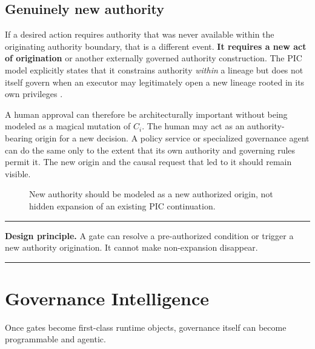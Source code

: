 \documentclass[10pt,oneside,openany]{book}
\newcommand{\principle}[1]{%
  \vspace{4pt}
  \noindent\begin{minipage}{\linewidth}
  \hrule\vspace{5pt}
  \small\sffamily\raggedright\textbf{Design principle.} #1
  \vspace{5pt}\hrule
  \end{minipage}\vspace{4pt}
}
\begin{document}
\section{Genuinely new authority}
If a desired action requires authority that was never available within the originating authority boundary, that is a different event. \textbf{It requires a new act of origination} or another externally governed authority construction. The PIC model explicitly states that it constrains authority \emph{within} a lineage but does not itself govern when an executor may legitimately open a new lineage rooted in its own privileges \cite{gallo2026pic}.

A human approval can therefore be architecturally important without being modeled as a magical mutation of $C_i$. The human may act as an authority-bearing origin for a new decision. A policy service or specialized governance agent can do the same only to the extent that its own authority and governing rules permit it. The new origin and the causal request that led to it should remain visible.

\begin{figure}[ht]
\centering
{}
\caption{New authority should be modeled as a new authorized origin, not hidden expansion of an existing PIC continuation.}
\end{figure}

\principle{A gate can resolve a pre-authorized condition or trigger a new authority origination. It cannot make non-expansion disappear.}

\chapter{Governance Intelligence}

Once gates become first-class runtime objects, governance itself can become programmable and agentic.
\end{document}
